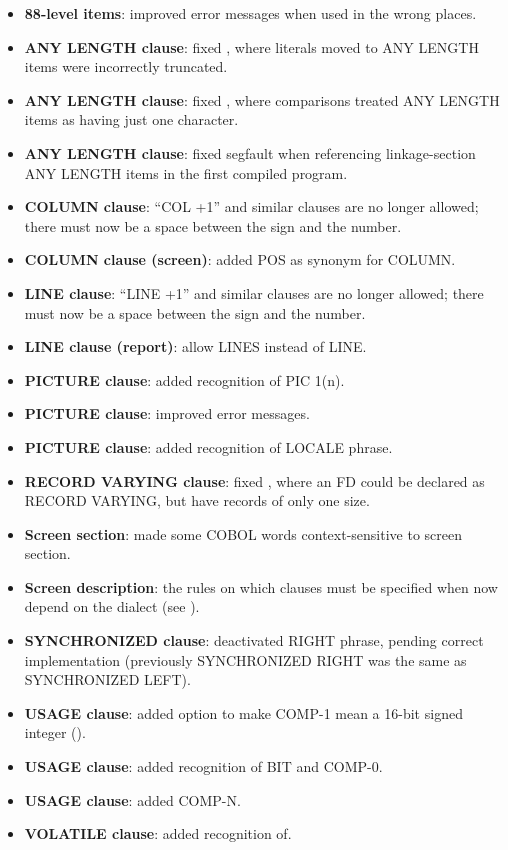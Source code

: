 \begin{itemize}
\item \textbf{88-level items}: improved error messages when used in the wrong places.
\item \textbf{ANY LENGTH clause}: fixed , where literals moved to ANY LENGTH items were incorrectly truncated.
\item \textbf{ANY LENGTH clause}: fixed , where comparisons treated ANY LENGTH items as having just one character.
\item \textbf{ANY LENGTH clause}: fixed segfault when referencing linkage-section ANY LENGTH items in the first compiled program.
\item \textbf{COLUMN clause}: ``COL +1'' and similar clauses are no longer allowed; there must now be a space between the sign and the number.
\item \textbf{COLUMN clause (screen)}: added POS as synonym for COLUMN.
\item \textbf{LINE clause}: ``LINE +1'' and similar clauses are no longer allowed; there must now be a space between the sign and the number.
\item \textbf{LINE clause (report)}: allow LINES instead of LINE.
\item \textbf{PICTURE clause}: added recognition of PIC 1(n).
\item \textbf{PICTURE clause}: improved error messages.
\item \textbf{PICTURE clause}: added recognition of LOCALE phrase.
\item \textbf{RECORD VARYING clause}: fixed , where an FD could be declared as RECORD VARYING, but have records of only one size.
\item \textbf{Screen section}: made some COBOL words context-sensitive to screen section.
\item \textbf{Screen description}: the rules on which clauses must be specified when now depend on the dialect (see ).
\item \textbf{SYNCHRONIZED clause}: deactivated RIGHT phrase, pending correct implementation (previously SYNCHRONIZED RIGHT was the same as SYNCHRONIZED LEFT).
\item \textbf{USAGE clause}: added option to make COMP-1 mean a 16-bit signed integer ().
\item \textbf{USAGE clause}: added recognition of BIT and COMP-0.
\item \textbf{USAGE clause}: added COMP-N.
\item \textbf{VOLATILE clause}: added recognition of.
\end{itemize}

